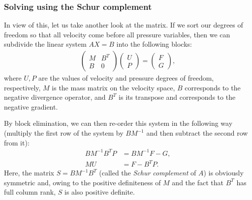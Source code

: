 \documentclass{article}
\begin{document}
\subsubsection*{Solving using the Schur complement}

In view of this, let us take another look at the matrix. If we sort our
degrees of freedom so that all velocity come before all pressure variables,
then we can subdivide the linear system $AX=B$ into the following blocks:
\begin{align*}
  \begin{pmatrix}
    M & B^T \\ B & 0
  \end{pmatrix}
  \begin{pmatrix}
    U \\ P
  \end{pmatrix}
  =
  \begin{pmatrix}
    F \\ G
  \end{pmatrix},
\end{align*}
where $U,P$ are the values of velocity and pressure degrees of freedom,
respectively, $M$ is the mass matrix on the velocity space, $B$ corresponds to
the negative divergence operator, and $B^T$ is its transpose and corresponds
to the negative gradient.

By block elimination, we can then re-order this system in the following way
(multiply the first row of the system by $BM^{-1}$ and then subtract the
second row from it):
\begin{align*}
  BM^{-1}B^T P &= BM^{-1} F - G, \\
  MU &= F - B^TP.
\end{align*}
Here, the matrix $S=BM^{-1}B^T$ (called the \textit{Schur complement} of $A$)
is obviously symmetric and, owing to the positive definiteness of $M$ and the
fact that $B^T$ has full column rank, $S$ is also positive
definite. 
\end{document}
